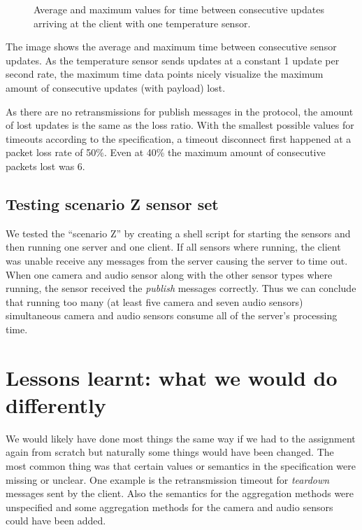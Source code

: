 \documentclass[a4paper]{article}
\begin{document}
\begin{figure}[h!]
\caption{Average and maximum values for time between consecutive updates arriving at the client with one temperature sensor.} \label{fig:lossdata}
\end{figure}

The image shows the average and maximum time between consecutive sensor updates.
As the temperature sensor sends updates at a constant 1 update per second rate,
the maximum time data points nicely visualize the maximum amount of consecutive
updates (with payload) lost.

As there are no retransmissions for publish messages in the protocol, the amount
of lost updates is the same as the loss ratio. With the smallest possible values
for timeouts according to the specification, a timeout disconnect first happened
at a packet loss rate of 50\%. Even at 40\% the maximum amount of consecutive
packets lost was 6.

\subsection{Testing scenario Z sensor set}
We tested the ``scenario Z'' by creating a shell script
for starting the sensors and then running one server and one client. If all
sensors where running, the client was unable receive any messages from the
server causing the server to time out. When one camera and audio sensor along
with the other sensor types where running, the sensor received the \emph{publish}
messages correctly. Thus we can conclude that running too many (at least five
camera and seven audio sensors) simultaneous camera and audio sensors consume
all of the server's processing time.

\section{Lessons learnt: what we would do differently}
We would likely have done most things the same way if we had to the assignment
again from scratch but naturally some things would have been changed. The most
common thing was that certain values or semantics in the specification were
missing or unclear. One example is the retransmission timeout for \emph{teardown}
messages sent by the client. Also the semantics for the aggregation methods
were unspecified and some aggregation methods for the camera and audio sensors
could have been added. 
\end{document}
